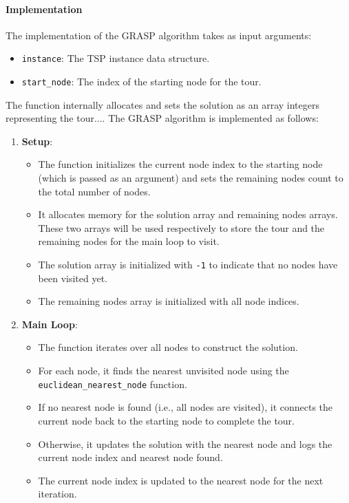 \documentclass{article}
\begin{document}
\paragraph{Implementation}
The implementation of the GRASP algorithm takes as input arguments:
\begin{itemize}
	\item \texttt{instance}: The TSP instance data structure.
	\item \texttt{start\_node}: The index of the starting node for the tour.
\end{itemize}
The function internally allocates and sets the solution as an array integers representing the tour....
The GRASP algorithm is implemented as follows:
\begin{enumerate} 
	\item \textbf{Setup}:
	      \begin{itemize}
		      \item The function initializes the current node index to the starting node (which is passed as an argument) 
			  and sets the remaining nodes count to the total number of nodes.
		      \item It allocates memory for the solution array and remaining nodes arrays. These two arrays will be used respectively to store the tour and the remaining nodes for the main loop to visit.
		      \item The solution array is initialized with \texttt{-1} to indicate that no nodes have been visited yet.
		      \item The remaining nodes array is initialized with all node indices.
	      \end{itemize}

	\item \textbf{Main Loop}:
	      \begin{itemize}
		      \item The function iterates over all nodes to construct the solution.
		      \item For each node, it finds the nearest unvisited node using the \texttt{euclidean\_nearest\_node} function.
		      \item If no nearest node is found (i.e., all nodes are visited), it connects the current node back to the starting node to complete the tour.
		      \item Otherwise, it updates the solution with the nearest node and logs the current node index and nearest node found.
		      \item The current node index is updated to the nearest node for the next iteration.
	      \end{itemize}
		


\end{enumerate}
\end{document}
